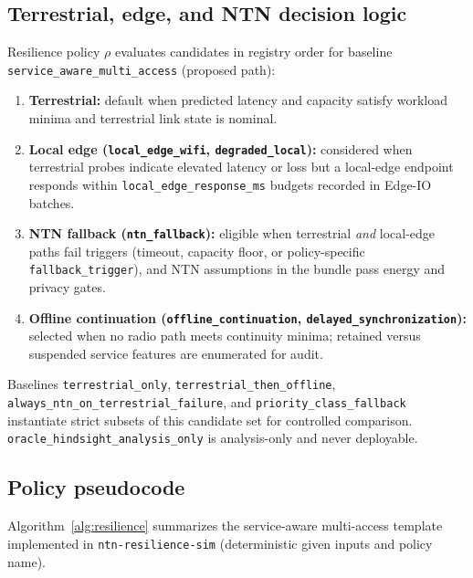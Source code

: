 \subsection{Terrestrial, edge, and NTN decision logic}
Resilience policy $\rho$ evaluates candidates in registry order for baseline \texttt{service\_aware\_multi\_access} (proposed path):
\begin{enumerate}
  \item \textbf{Terrestrial:} default when predicted latency and capacity satisfy workload minima and terrestrial link state is nominal.
  \item \textbf{Local edge (\texttt{local\_edge\_wifi}, \texttt{degraded\_local}):} considered when terrestrial probes indicate elevated latency or loss but a local-edge endpoint responds within \texttt{local\_edge\_response\_ms} budgets recorded in Edge-IO batches.
  \item \textbf{NTN fallback (\texttt{ntn\_fallback}):} eligible when terrestrial \emph{and} local-edge paths fail triggers (timeout, capacity floor, or policy-specific \texttt{fallback\_trigger}), and NTN assumptions in the bundle pass energy and privacy gates.
  \item \textbf{Offline continuation (\texttt{offline\_continuation}, \texttt{delayed\_synchronization}):} selected when no radio path meets continuity minima; retained versus suspended service features are enumerated for audit.
\end{enumerate}
Baselines \texttt{terrestrial\_only}, \texttt{terrestrial\_then\_offline}, \texttt{always\_ntn\_on\_terrestrial\_failure}, and \texttt{priority\_class\_fallback} instantiate strict subsets of this candidate set for controlled comparison.
\texttt{oracle\_hindsight\_analysis\_only} is analysis-only and never deployable.

\subsection{Policy pseudocode}
Algorithm~\ref{alg:resilience} summarizes the service-aware multi-access template implemented in \texttt{ntn-resilience-sim} (deterministic given inputs and policy name).

